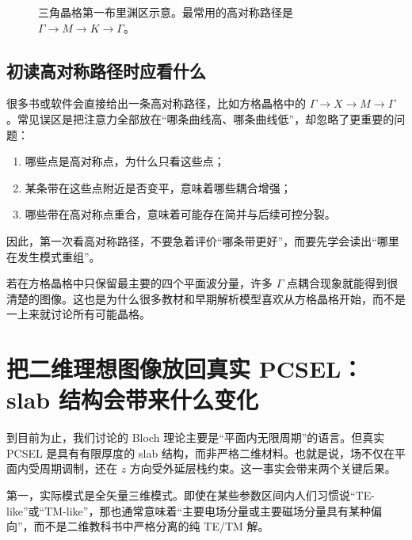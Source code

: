 \begin{figure}[htbp]
  \centering
  \caption{三角晶格第一布里渊区示意。最常用的高对称路径是 $\Gamma\rightarrow M\rightarrow K\rightarrow\Gamma$。}
  \label{fig:bz-triangular}
\end{figure}

\subsection{初读高对称路径时应看什么}
很多书或软件会直接给出一条高对称路径，比如方格晶格中的 $\Gamma\rightarrow X\rightarrow M\rightarrow\Gamma$。常见误区是把注意力全部放在“哪条曲线高、哪条曲线低”，却忽略了更重要的问题：
\begin{enumerate}
  \item 哪些点是高对称点，为什么只看这些点；
  \item 某条带在这些点附近是否变平，意味着哪些耦合增强；
  \item 哪些带在高对称点重合，意味着可能存在简并与后续可控分裂。
\end{enumerate}
因此，第一次看高对称路径，不要急着评价“哪条带更好”，而要先学会读出“哪里在发生模式重组”。

若在方格晶格中只保留最主要的四个平面波分量，许多 $\Gamma$ 点耦合现象就能得到很清楚的图像。这也是为什么很多教材和早期解析模型喜欢从方格晶格开始，而不是一上来就讨论所有可能晶格。

\section{把二维理想图像放回真实 PCSEL：slab 结构会带来什么变化}
到目前为止，我们讨论的 Bloch 理论主要是“平面内无限周期”的语言。但真实 PCSEL 是具有有限厚度的 slab 结构，而非严格二维材料。也就是说，场不仅在平面内受周期调制，还在 $z$ 方向受外延层栈约束。这一事实会带来两个关键后果。

第一，实际模式是全矢量三维模式。即使在某些参数区间内人们习惯说“TE-like”或“TM-like”，那也通常意味着“主要电场分量或主要磁场分量具有某种偏向”，而不是二维教科书中严格分离的纯 TE/TM 解。

